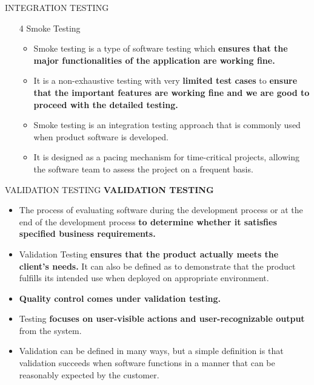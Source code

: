 \documentclass{beamer}
\begin{document}
\begin{frame}{INTEGRATION TESTING}
	\begin{itemize}
		\item[4] Smoke Testing
		\begin{itemize}
			\item Smoke testing is a type of software testing which\textbf{ ensures that the major functionalities of the application are working fine. }
			\item It is a non-exhaustive testing with very \textbf{limited test cases} to \textbf{ensure that the important features are working fine and we are good to proceed with the detailed testing.}
			\item Smoke testing is an integration testing approach that is commonly used when product software is developed. 
			\item It is designed as a pacing mechanism for time-critical projects, allowing the software team to assess the project on a frequent basis. 
			
		\end{itemize}
	\end{itemize}
\end{frame}

\begin{frame}{VALIDATION TESTING}
	\textbf{VALIDATION TESTING}
	\begin{itemize}
		\item The process of evaluating software during the development process or at the end of the development process \textbf{to determine whether it satisfies specified business requirements.}
		\item Validation Testing\textbf{ ensures that the product actually meets the client's needs.} It can also be defined as to demonstrate that the product fulfills its intended use when deployed on appropriate environment.
		\item \textbf{Quality control comes under validation testing.}
		\item Testing\textbf{ focuses on user-visible actions and user-recognizable output }from the system.
		\item Validation can be defined in many ways, but a simple definition is that validation succeeds when software functions in a manner that can be reasonably expected by the customer. 
		
	\end{itemize}
\end{frame}
\end{document}
